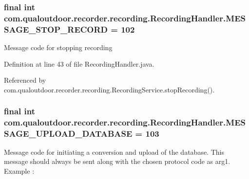 \hypertarget{classcom_1_1qualoutdoor_1_1recorder_1_1recording_1_1RecordingHandler_a6a4c48abcb8b3e837f706597c3e6e07d}{
\subsubsection[{M\-E\-S\-S\-A\-G\-E\-\_\-\-S\-T\-O\-P\-\_\-\-R\-E\-C\-O\-R\-D}]{\setlength{\rightskip}{0pt plus 5cm}final int com.\-qualoutdoor.\-recorder.\-recording.\-Recording\-Handler.\-M\-E\-S\-S\-A\-G\-E\-\_\-\-S\-T\-O\-P\-\_\-\-R\-E\-C\-O\-R\-D = 102\hspace{0.3cm}{\ttfamily [static]}}}\label{classcom_1_1qualoutdoor_1_1recorder_1_1recording_1_1RecordingHandler_a6a4c48abcb8b3e837f706597c3e6e07d}
Message code for stopping recording 

Definition at line 43 of file Recording\-Handler.\-java.



Referenced by com.\-qualoutdoor.\-recorder.\-recording.\-Recording\-Service.\-stop\-Recording().

\hypertarget{classcom_1_1qualoutdoor_1_1recorder_1_1recording_1_1RecordingHandler_a4a893d8da4a4d1f0811ca8b3fe5a1793}{
\subsubsection[{M\-E\-S\-S\-A\-G\-E\-\_\-\-U\-P\-L\-O\-A\-D\-\_\-\-D\-A\-T\-A\-B\-A\-S\-E}]{\setlength{\rightskip}{0pt plus 5cm}final int com.\-qualoutdoor.\-recorder.\-recording.\-Recording\-Handler.\-M\-E\-S\-S\-A\-G\-E\-\_\-\-U\-P\-L\-O\-A\-D\-\_\-\-D\-A\-T\-A\-B\-A\-S\-E = 103\hspace{0.3cm}{\ttfamily [static]}}}\label{classcom_1_1qualoutdoor_1_1recorder_1_1recording_1_1RecordingHandler_a4a893d8da4a4d1f0811ca8b3fe5a1793}
Message code for initiating a conversion and upload of the database. This message should always be sent along with the chosen protocol code as arg1. Example \-:


